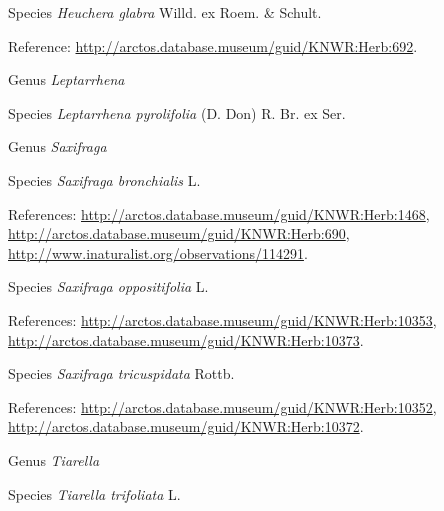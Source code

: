 \documentclass[9pt, article]{memoir}
\begin{document}
\begin{multicols}{2}
\vspace{6pt}\noindent\hspace{36pt}Species \textit{Heuchera glabra} Willd. ex Roem. \& Schult.


\vspace{6pt}Reference: 
\url{http://arctos.database.museum/guid/KNWR:Herb:692}.

\vspace{6pt}\noindent\hspace{30pt}Genus \textit{Leptarrhena}


\vspace{6pt}\noindent\hspace{36pt}Species \textit{Leptarrhena pyrolifolia} (D. Don) R. Br. ex Ser.


\vspace{6pt}\noindent\hspace{30pt}Genus \textit{Saxifraga}


\vspace{6pt}\noindent\hspace{36pt}Species \textit{Saxifraga bronchialis} L.


\vspace{6pt}References: 
\url{http://arctos.database.museum/guid/KNWR:Herb:1468}, 
\url{http://arctos.database.museum/guid/KNWR:Herb:690}, 
\url{http://www.inaturalist.org/observations/114291}.

\vspace{6pt}\noindent\hspace{36pt}Species \textit{Saxifraga oppositifolia} L.


\vspace{6pt}References: 
\url{http://arctos.database.museum/guid/KNWR:Herb:10353}, 
\url{http://arctos.database.museum/guid/KNWR:Herb:10373}.

\vspace{6pt}\noindent\hspace{36pt}Species \textit{Saxifraga tricuspidata} Rottb.


\vspace{6pt}References: 
\url{http://arctos.database.museum/guid/KNWR:Herb:10352}, 
\url{http://arctos.database.museum/guid/KNWR:Herb:10372}.

\vspace{6pt}\noindent\hspace{30pt}Genus \textit{Tiarella}


\vspace{6pt}\noindent\hspace{36pt}Species \textit{Tiarella trifoliata} L.



\end{multicols}
\end{document}
